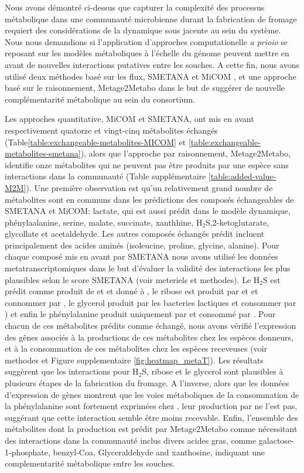 \documentclass[../main.tex]{subfiles}
\begin{document}
Nous avons démontré ci-dessus que capturer la complexité des processus métabolique dans une communauté microbienne durant la fabrication de fromage requiert des considérations de la dynamique sous jacente au sein du système. Nous nous demandions si l'application d'approches computationelle \textit{a prioio} se reposant sur les modèles métaboliques à l'échelle du génome peuvent mettre en avant de nouvelles interactions putatives entre les souches. A cette fin, nous avons utilisé deux méthodes basé sur les flux, SMETANA \citep{Zelezniak2015} et MiCOM \citep{diener2020}, et une approche basé sur le raisonnement, Metage2Metabo \citep{Belcour.2020} dans le but de suggérer de nouvelle complémentarité métabolique au sein du consortium.

Les approches quantitative, MiCOM et SMETANA, ont mis en avant respectivement quatorze et vingt-cinq métabolites échangés (Table\ref{table:exchangeable-metabolites-MICOM} et \ref{table:exchangeable-metabolites-smetana}), alors que l'approche par raisonnement, Metage2Metabo, identifie onze métabolites qui ne peuvent pas être produits par une espèce sans interactions dans la communauté (Table supplémentaire \ref{table:added-value-M2M}). Une première observation est qu'un relativement grand nombre de métabolites sont en communs dans les prédictions des composés échangeables de SMETANA et MiCOM: lactate, qui est aussi prédit dans le modèle dynamique, phénylaalanine, serine, malate, succinate, xanthhine, H${_2}$S,2-ketoglutarate, glycollate et acetaldehyde. Les autres composés échangés prédit incluent principalement des acides aminés (isoleucine, proline, glycine, alanine). Pour chaque composé mis en avant par SMETANA nous avons utilisé les données metatranscriptomiques dans le but d'évaluer la validité des interactions les plus plausibles selon le score SMETANA (voir meteriels et methodes). Le H${_2}$S est prédit comme produit de \lactis et \plantarum et donné à \freud, le ribose est produit par \lactis et \plantarum et connommer par \freud, le glycerol produit par les bacteries lactiques et consommer par \freud) et enfin le phénylalanine produit uniquement par \plantarum et consommé par \freud. Pour chacun de ces métabolites prédits comme échangé, nous avons vérifié l'expression des gênes associés à la productions de ces métabolites chez les espèces donneurs, et à la consommation de ces métabolites chez les espèces receveuses (voir methodes et Figure supplementaire \ref{fig:heatmap_metaT}). Les résultats suggèrent que les interactions pour H${_2}$S, ribose et le glycerol sont plausibles à plusieurs étapes de la fabrication du fromage. A l'inverse, alors que les données d'expression de gènes montrent que les voies métaboliques de la consommation de la phénylalanine sont fortement exprimées chez \freud, leur production par \plantarum ne l'est pas, suggérant que cette interaction semble être moins recevable. Enfin, l'ensemble des métabolites dont la production est prédit par Metage2Metabo comme nécessitant des interactions dans la communauté inclus divers acides gras, comme galactose-1-phosphate, benzyl-Coa, Glyceraldehyde and xanthosine, indiquant une complementarité métabolique entre les souches.
\end{document}
